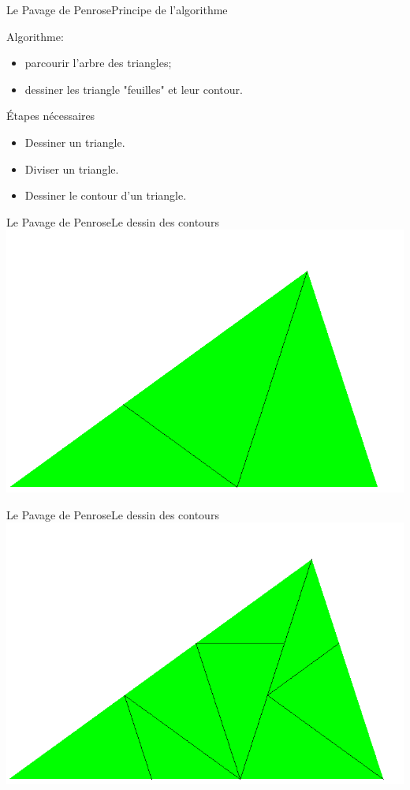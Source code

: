 \documentclass[11pt]{beamer}
\begin{document}
\begin{frame}{Le Pavage de Penrose}{Principe de l'algorithme}
\begin{block}{Algorithme:}
  \begin{itemize}
    \item parcourir l'arbre des triangles;
    \item dessiner les triangle "feuilles" et leur contour.
  \end{itemize}
\end{block}
\begin{block}{Étapes nécessaires}
  \begin{itemize}
      \item Dessiner un triangle.
      \item Diviser un triangle.
      \item Dessiner le contour d'un triangle.
  \end{itemize}
\end{block}
\end{frame}

\begin{frame}{Le Pavage de Penrose}{Le dessin des contours}
  \includegraphics[scale=0.3]{penrose_inline1.png}
\end{frame}

\begin{frame}{Le Pavage de Penrose}{Le dessin des contours}
  \includegraphics[scale=0.3]{penrose_inline2.png}
\end{frame}
\end{document}
